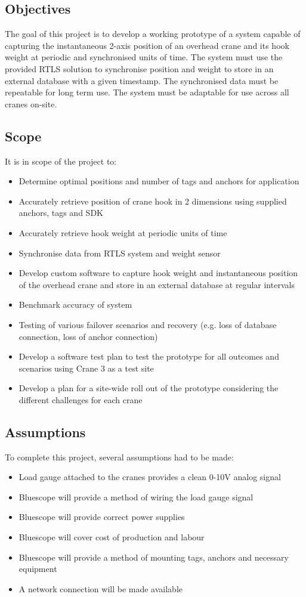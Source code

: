 \documentclass[12pt, a4paper]{article}
\begin{document}
\subsection{Objectives}
The goal of this project is to develop a working prototype of a system capable of capturing the instantaneous 
2-axis position of an overhead crane and its hook weight at periodic and synchronised units of time. The system must 
use the provided RTLS solution to synchronise position and weight to store in an external database with a given timestamp. 
The synchronised data must be repeatable for long term use. The system must be adaptable for use across all cranes on-site. 
\subsection{Scope}
It is in scope of the project to:
\begin{itemize}
    \item Determine optimal positions and number of tags and anchors for application
    \item Accurately retrieve position of crane hook in 2 dimensions using supplied anchors, tags and SDK
    \item Accurately retrieve hook weight at periodic units of time
    \item Synchronise data from RTLS system and weight sensor
    \item Develop custom software to capture hook weight and instantaneous position of the overhead crane and store in an external database at regular intervals
    \item Benchmark accuracy of system
    \item Testing of various failover scenarios and recovery (e.g. loss of database connection, loss of anchor connection)
    \item Develop a software test plan to test the prototype for all outcomes and scenarios using Crane 3 as a test site
    \item Develop a plan for a site-wide roll out of the prototype considering the different challenges for each crane
\end{itemize}
\subsection{Assumptions}
To complete this project, several assumptions had to be made:
\begin{itemize}
    \item Load gauge attached to the cranes provides a clean 0-10V analog signal
    \item Bluescope will provide a method of wiring the load gauge signal
    \item Bluescope will provide correct power supplies
    \item Bluescope will cover cost of production and labour
    \item Bluescope will provide a method of mounting tags, anchors and necessary equipment
    \item A network connection will be made available
\end{itemize}
\end{document}
